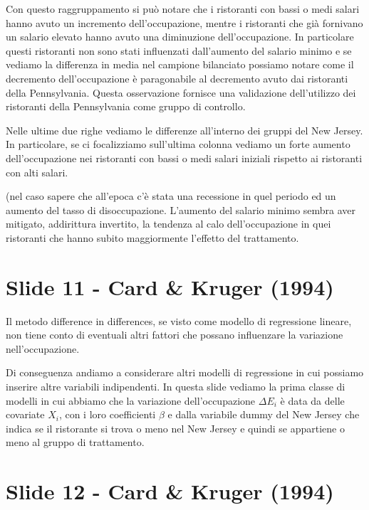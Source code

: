 \documentclass{article}
\begin{document}
Con questo raggruppamento si può notare che i ristoranti con bassi o medi salari hanno avuto un incremento dell'occupazione, mentre i ristoranti che già fornivano un salario elevato hanno avuto una diminuzione dell'occupazione. In particolare questi ristoranti non sono stati influenzati dall'aumento del salario minimo e se vediamo la differenza in media nel campione bilanciato possiamo notare come il decremento dell'occupazione è paragonabile al decremento avuto dai ristoranti della Pennsylvania. Questa osservazione fornisce una validazione dell'utilizzo dei ristoranti della Pennsylvania come gruppo di controllo.

Nelle ultime due righe vediamo le differenze all'interno dei gruppi del New Jersey. In particolare, se ci focalizziamo sull'ultima colonna vediamo un forte aumento dell'occupazione nei ristoranti con bassi o medi salari iniziali rispetto ai ristoranti con alti salari.

(nel caso sapere che all'epoca c'è stata una recessione in quel periodo ed un aumento del tasso di disoccupazione. L'aumento del salario minimo sembra aver mitigato, addirittura invertito, la tendenza al calo dell'occupazione in quei ristoranti che hanno subito maggiormente l'effetto del trattamento. 


\section{Slide 11 - Card \& Kruger (1994)}

Il metodo difference in differences, se visto come modello di regressione lineare, non tiene conto di eventuali altri fattori che possano influenzare la variazione nell'occupazione.

Di conseguenza andiamo a considerare altri modelli di regressione in cui possiamo inserire altre variabili indipendenti. In questa slide vediamo la prima classe di modelli in cui abbiamo che la variazione dell'occupazione $\Delta E_i$ è data da delle covariate $X_i$, con i loro coefficienti $\beta$ e dalla variabile dummy del New Jersey che indica se il ristorante si trova o meno nel New Jersey e quindi se appartiene o meno al gruppo di trattamento.

 

\section{Slide 12 - Card \& Kruger (1994)}
\end{document}
